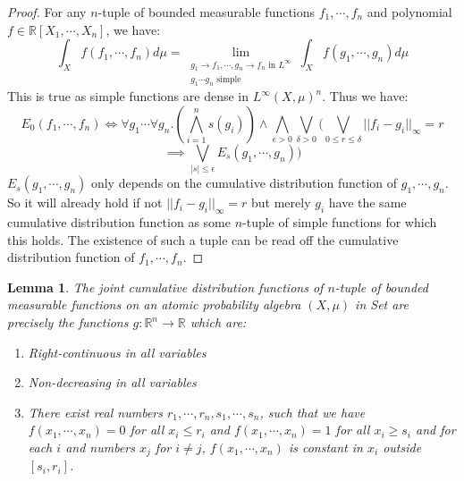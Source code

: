 \documentclass[a4paper]{amsproc}
\theoremstyle{plain}
\newtheorem{lemma}[theorem]{Lemma}
\theoremstyle{definition}
\theoremstyle{remark}
\numberwithin{equation}{section}
\begin{document}
\begin{proof}
For any $n$-tuple of bounded measurable functions $f_1,\cdots, f_n$ and polynomial $f\in \mathbb{R}[X_1,\cdots, X_n]$, we have:
\[\int_X f(f_1,\cdots,f_n)d\mu=\lim_{\substack{g_1\rightarrow f_1,\cdots, g_n\rightarrow f_n \text{ in }L^\infty\\ g_1\cdots g_n \text{ simple}}}  \int_Xf(g_1,\cdots,g_n)d\mu \]%
This is true as simple functions are dense in $L^\infty(X,\mu)^n$. Thus we have:
\[E_0(f_1,\cdots,f_n)\iff \forall g_1\cdots \forall g_n.(\bigwedge_{i=1}^n s(g_i))\wedge\bigwedge_{\epsilon>0}\bigvee_{\delta>0}(\bigvee_{0\leq r\leq \delta}||f_i-g_i||_\infty=r \]
\[\implies\bigvee_{|s|\leq\epsilon} E_s(g_1,\cdots,g_n) )\]%
$E_s(g_1,\cdots,g_n)$ only depends on the cumulative distribution function of $g_1,\cdots,g_n$. So it will already hold if not $||f_i-g_i||_\infty=r$ but merely $g_i$ have the same  cumulative distribution function as some $n$-tuple of simple functions for which this holds. The existence of such a tuple can be read off the cumulative distribution function of $f_1,\cdots,f_n$.%
\end{proof}
\begin{lemma}\label{distribution_L_infty} The joint cumulative distribution functions of $n$-tuple of bounded measurable functions on an atomic probability algebra $(X,\mu)$ in Set are precisely the functions $g:\mathbb{R}^n\rightarrow \mathbb{R}$ which are:
\begin{enumerate}
\item Right-continuous in all variables
\item Non-decreasing in all variables
\item There exist real numbers $r_1,\cdots,r_n,s_1,\cdots, s_n$, such that we have $f(x_1,\cdots,x_n)=0$ for all $x_i\leq r_i$ and $f(x_1,\cdots,x_n)=1$ for all $x_i\geq s_i$  and for each $i$ and numbers $x_j$ for $i\neq j$, $f(x_1,\cdots,x_n)$ is constant in $x_i$ outside $[s_i,r_i]$.%
\end{enumerate}
\end{lemma}
\end{document}
